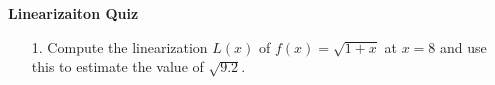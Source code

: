 \documentclass[11pt]{article}
\begin{document}
	
	
	
	
	\centerline{\textbf{\Large{Linearizaiton Quiz}}}
	
	\vspace{0.2in}
	
	
	\begin{enumerate}
		
		\item[1.] Compute the linearization $L(x)$ of $f(x) = \sqrt{1 + x}$ at $x = 8$ and use this to estimate the value of $\sqrt{9.2}$. 
		
	\end{enumerate}
	
	
	
	
	
	
	
	
\end{document}
